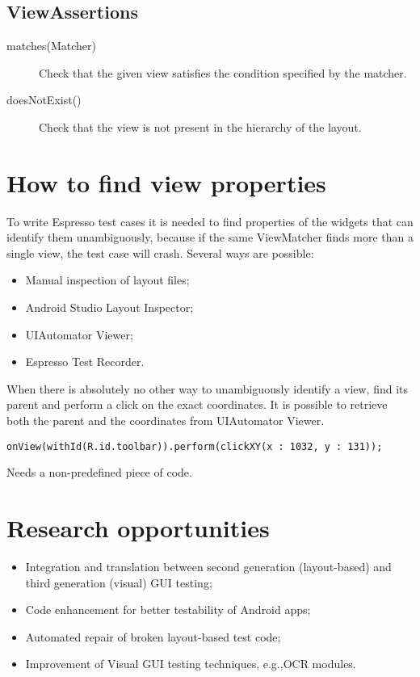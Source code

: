 \subsection{ViewAssertions}
\begin{description}
\item [matches(Matcher)] Check that the given view satisfies the condition specified by the matcher.
\item [doesNotExist()] Check that the view is not present in the hierarchy of the layout.
\end{description}

\section{How to find view properties}
To write Espresso test cases it is needed to find properties of the widgets that can identify them unambiguously, because if the same ViewMatcher finds more than a single view, the test case will crash. Several ways are possible:

\begin{itemize}
\item Manual inspection of layout files;
\item Android Studio Layout Inspector;
\item UIAutomator Viewer;
\item Espresso Test Recorder.
\end{itemize}

When there is absolutely no other way to unambiguously identify a view, find its parent and perform a click on the exact coordinates. It is possible to retrieve both the parent and the coordinates from UIAutomator Viewer.
\begin{verbatim}
onView(withId(R.id.toolbar)).perform(clickXY(x : 1032, y : 131));
\end{verbatim}
Needs a non-predefined piece of code.

\section*{Research opportunities}
\begin{itemize}
\item Integration and translation between second generation (layout-based) and third generation (visual) GUI testing;
\item Code enhancement for better testability of Android apps;
\item Automated repair of broken layout-based test code;
\item Improvement of Visual GUI testing techniques, e.g.,\@ OCR modules. 
\end{itemize}
